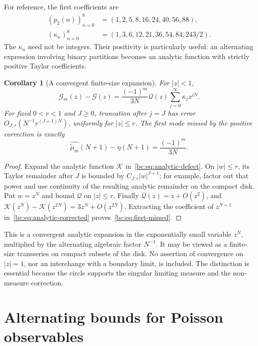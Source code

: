 \documentclass[11pt,a4paper,oneside,openany]{book}
\numberwithin{equation}{chapter}
\newtheorem{corollary}[theorem]{Corollary}
\theoremstyle{definition}
\theoremstyle{remark}
\newcommand{\mt}{\widetilde\mu}
\begin{document}
For reference, the first coefficients are
\begin{align*}
 (p_2(n))_{n=0}^{8}&=(1,2,5,8,16,24,40,56,88),\\
 (\kappa_n)_{n=0}^{8}&=(1,3,6,12,21,36,54,84,243/2).
\end{align*}
The $\kappa_n$ need not be integers. Their positivity is particularly useful:
an alternating expression involving binary partitions becomes an analytic
function with strictly positive Taylor coefficients.

\begin{corollary}[A convergent finite-size expansion]
\label{bc:cor:transseries}
For $|z|<1$,
\begin{equation}
 \mathcal G_m(z)-\mathcal G(z)
 =\frac{(-1)^m}{3N}\mathcal Q(z)
       \sum_{j=0}^{\infty}\kappa_jz^{jN}.
 \label{bc:eq:lacunary-expansion}
\end{equation}
For fixed $0<r<1$ and $J\ge0$, truncation after $j=J$ has error
$O_{J,r}(N^{-1}r^{(J+1)N})$, uniformly for $|z|\le r$.
The first mode missed by the positive correction is exactly
\begin{equation}
 \widehat{\mt_m}(N+1)-\eta(N+1)=\frac{(-1)^m}{3N}.
 \label{bc:eq:first-missed}
\end{equation}
\end{corollary}
\begin{proof}
Expand the analytic function $\mathcal K$ in~\eqref{bc:eq:analytic-defect}. On $|w|\le r$,
its Taylor remainder after $J$ is bounded by $C_{J,r}|w|^{J+1}$; for example,
factor out that power and use continuity of the resulting analytic remainder
on the compact disk. Put $w=z^N$ and bound $\mathcal Q$ on $|z|\le r$.
Finally $\mathcal Q(z)=z+O(z^2)$, and
$\mathcal K(z^N)-\mathcal K(z^{2N})=3z^N+O(z^{2N})$. Extracting the coefficient of $z^{N+1}$
in~\eqref{bc:eq:analytic-corrected} proves~\eqref{bc:eq:first-missed}.
\end{proof}

This is a convergent analytic expansion in the exponentially small variable
$z^N$, multiplied by the alternating algebraic factor $N^{-1}$. It may be
viewed as a finite-size transseries on compact subsets of the disk. No assertion
of convergence on $|z|=1$, nor an interchange with a boundary limit, is included.
The distinction is essential because the circle supports the singular limiting
measure and the non-measure correction.
\chapter{Alternating bounds for Poisson observables}
\label{bc:sec:poisson}
\end{document}
